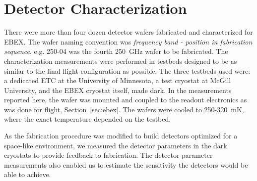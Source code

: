 \chapter{Detector Characterization}
\label{sec:detector_characterization}




There were more than four dozen detector wafers fabricated and characterized for \ac{EBEX}. 
The wafer naming convention was \textit{frequency band - position in fabrication sequence}, e.g. 250-04 was the fourth 250~GHz wafer to be fabricated.
The characterization measurements were performed in testbeds designed to be as similar to the final flight configuration as possible. 
The three testbeds used were: 
a dedicated \ac{ETC}  at the University of Minnesota, %
a test cryostat at McGill University, and the \ac{EBEX} cryostat itself, made dark. 
In the measurements reported here, the wafer was mounted and coupled to the readout electronics as was done for flight, Section~\ref{sec:ebex}. 
The wafers were cooled to 250-320~mK, where the exact temperature depended on the testbed. 

As the fabrication procedure was modified to build detectors optimized for a space-like environment, we measured the detector parameters in the dark cryostats to provide feedback to fabrication. 
The detector parameter measurements also enabled us to estimate the sensitivity the detectors would be able to achieve. 

